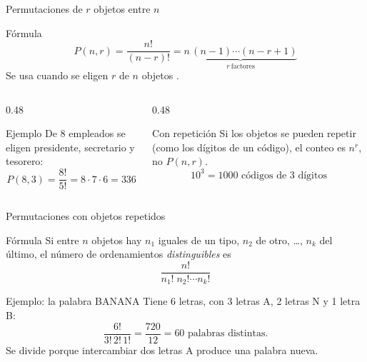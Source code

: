 \documentclass[aspectratio=169,10pt]{beamer}
\begin{document}
\begin{frame}{Permutaciones de $r$ objetos entre $n$}
  \begin{block}{Fórmula}
    \[ P(n,r)=\frac{n!}{(n-r)!}
       = \underbrace{n\,(n-1)\cdots(n-r+1)}_{r\ \text{factores}} \]
    Se usa cuando se eligen $r$ de $n$ objetos .
  \end{block}

  \vspace{0.2cm}
  \begin{columns}[T,onlytextwidth]
    \begin{column}{0.48\textwidth}
      \begin{exampleblock}{Ejemplo}
        \footnotesize
        De 8 empleados se eligen presidente, secretario y tesorero:
        \[ P(8,3)=\frac{8!}{5!}=8\cdot 7\cdot 6 = 336 \]
      \end{exampleblock}
    \end{column}
    \begin{column}{0.48\textwidth}
      \begin{alertblock}{Con repetición}
        \footnotesize
        Si los objetos se pueden repetir (como los dígitos de un código), el
        conteo es $n^{r}$, no $P(n,r)$.
        \[ 10^{3}=1000 \text{ códigos de 3 dígitos} \]
      \end{alertblock}
    \end{column}
  \end{columns}
\end{frame}

\begin{frame}{Permutaciones con objetos repetidos}
  \begin{block}{Fórmula}
    \small
    Si entre $n$ objetos hay $n_1$ iguales de un tipo, $n_2$ de otro, \dots,
    $n_k$ del último, el número de ordenamientos \emph{distinguibles} es
    \[ \frac{n!}{n_1!\;n_2!\cdots n_k!} \]
  \end{block}

  \vspace{0.2cm}
  \begin{exampleblock}{Ejemplo: la palabra BANANA}
    \footnotesize
    Tiene 6 letras, con 3 letras A, 2 letras N y 1 letra B:
    \[ \frac{6!}{3!\,2!\,1!}=\frac{720}{12}=60 \text{ palabras distintas.} \]
    Se divide porque intercambiar dos letras A  produce una palabra
    nueva.
  \end{exampleblock}
\end{frame}
\end{document}
